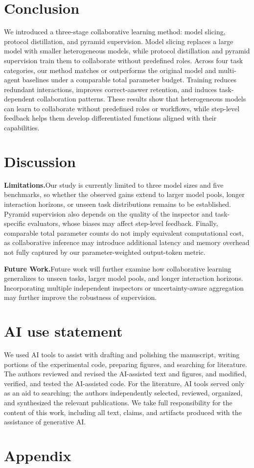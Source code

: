 \documentclass{article} %
\begin{document}
\section{Conclusion}

We introduced a three-stage collaborative learning method: model slicing, protocol distillation, and pyramid supervision. Model slicing replaces a large model with smaller heterogeneous models, while protocol distillation and pyramid supervision train them to collaborate without predefined roles. Across four task categories, our method matches or outperforms the original model and multi-agent baselines under a comparable total parameter budget. Training reduces redundant interactions, improves correct-answer retention, and induces task-dependent collaboration patterns. These results show that heterogeneous models can learn to collaborate without predefined roles or workflows, while step-level feedback helps them develop differentiated functions aligned with their capabilities.

\section{Discussion}

\noindent\textbf{Limitations.}\quad Our study is currently limited to three model sizes and five benchmarks, so whether the observed gains extend to larger model pools, longer interaction horizons, or unseen task distributions remains to be established. Pyramid supervision also depends on the quality of the inspector and task-specific evaluators, whose biases may affect step-level feedback. Finally, comparable total parameter counts do not imply equivalent computational cost, as collaborative inference may introduce additional latency and memory overhead not fully captured by our parameter-weighted output-token metric.


\noindent\textbf{Future Work.}\quad Future work will further examine how collaborative learning generalizes to unseen tasks, larger model pools, and longer interaction horizons. Incorporating multiple independent inspectors or uncertainty-aware aggregation may further improve the robustness of supervision.

\section*{AI use statement}

We used AI tools to assist with drafting and polishing the manuscript, writing portions of the experimental code, preparing figures, and searching for literature. The authors reviewed and revised the AI-assisted text and figures, and modified, verified, and tested the AI-assisted code. For the literature, AI tools served only as an aid to searching; the authors independently selected, reviewed, organized, and synthesized the relevant publications. We take full responsibility for the content of this work, including all text, claims, and artifacts produced with the assistance of generative AI.




\clearpage
\appendix
\section*{Appendix}

\end{document}
